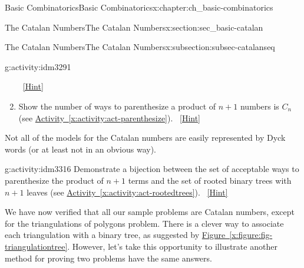 \documentclass[oneside,10pt,]{book}
\numberwithin{equation}{chapter}
\def\fivegon{%
    \coordinate (a) at (0,2.5);
    \coordinate (b) at (2,1.4);
    \coordinate (c) at (1,0);
    \coordinate (d) at (-.5,0);
    \coordinate (e) at (-2,1.5);
    \draw (a) -- (b) -- (c) -- (d) -- (e) -- (a);
  }
\newcommand{\vtx}[2]{node[fill,circle,inner sep=0pt, minimum size=4pt,label=#1:#2]{}}
\newcommand{\vr}[1]{\vtx{right}{#1}}
\newcommand{\vl}[1]{\vtx{left}{#1}}
\renewcommand{\v}{\vtx{above}{}}
\begin{document}
\begin{chapterptx}{Basic Combinatorics}{}{Basic Combinatorics}{}{}{x:chapter:ch_basic-combinatorics}
\begin{sectionptx}{The Catalan Numbers}{}{The Catalan Numbers}{}{}{x:section:sec_basic-catalan}
\begin{subsectionptx}{The Catalan Numbers}{}{The Catalan Numbers}{}{}{x:subsection:subsec-catalanseq}
\begin{activity}{}{g:activity:idm3291}
\begin{enumerate}[font=\bfseries,label=(\alph*),ref=\alph*]
\qquad~\hfill{\tiny\hyperlink{g:hint:idm3299-back}{[Hint]}}\item{}Show the number of ways to parenthesize a product of \(n+1\) numbers is \(C_n\) (see \hyperref[x:activity:act-parenthesize]{Activity~\ref{x:activity:act-parenthesize}}).%
\qquad~\hfill{\tiny\hyperlink{g:hint:idm3307-back}{[Hint]}}\end{enumerate}
\end{activity}
Not all of the models for the Catalan numbers are easily represented by Dyck words (or at least not in an obvious way).%
\begin{activity}{}{g:activity:idm3316}%
Demonstrate a bijection between the set of acceptable ways to parenthesize the product of \(n+1\) terms and the set of rooted binary trees with \(n+1\) leaves (see \hyperref[x:activity:act-rootedtrees]{Activity~\ref{x:activity:act-rootedtrees}}).%
\qquad~\hfill{\tiny\hyperlink{g:hint:idm3322-back}{[Hint]}}\end{activity}
We have now verified that all our sample problems are Catalan numbers, except for the triangulations of polygons problem.  There is a clever way to associate each triangulation with a binary tree, as suggested by \hyperref[x:figure:fig-triangulationtree]{Figure~\ref{x:figure:fig-triangulationtree}}.  However, let's take this opportunity to illustrate another method for proving two problems have the same answers.%
\begin{figure}
\centering
\begin{sidebyside}{2}{0.125}{0.125}{0.25}%
\begin{sbspanel}{0.25}%

        \end{sbspanel}%
\begin{sbspanel}{0.25}%


\end{sbspanel}
\end{sidebyside}
\end{figure}
\end{subsectionptx}
\end{sectionptx}
\end{chapterptx}
\end{document}
